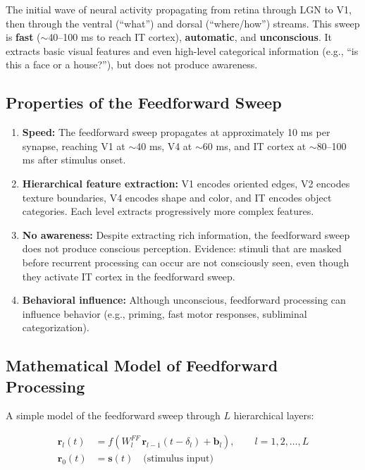 \documentclass[11pt,a4paper]{report}
\begin{document}
\begin{stagebox}
The initial wave of neural activity propagating from retina through LGN to V1, then through the ventral (``what'') and dorsal (``where/how'') streams. This sweep is \textbf{fast} ($\sim$40--100 ms to reach IT cortex), \textbf{automatic}, and \textbf{unconscious}. It extracts basic visual features and even high-level categorical information (e.g., ``is this a face or a house?''), but does not produce awareness.
\end{stagebox}

\subsection{Properties of the Feedforward Sweep}

\begin{enumerate}[leftmargin=2em]
  \item \textbf{Speed:} The feedforward sweep propagates at approximately 10 ms per synapse, reaching V1 at $\sim$40 ms, V4 at $\sim$60 ms, and IT cortex at $\sim$80--100 ms after stimulus onset.
  \item \textbf{Hierarchical feature extraction:} V1 encodes oriented edges, V2 encodes texture boundaries, V4 encodes shape and color, and IT encodes object categories. Each level extracts progressively more complex features.
  \item \textbf{No awareness:} Despite extracting rich information, the feedforward sweep does not produce conscious perception. Evidence: stimuli that are masked before recurrent processing can occur are not consciously seen, even though they activate IT cortex in the feedforward sweep.
  \item \textbf{Behavioral influence:} Although unconscious, feedforward processing can influence behavior (e.g., priming, fast motor responses, subliminal categorization).
\end{enumerate}

\subsection{Mathematical Model of Feedforward Processing}

A simple model of the feedforward sweep through $L$ hierarchical layers:

\begin{mathbox}
\vspace{-6pt}
\begin{align}
  \mathbf{r}_l(t) &= f\!\left(W_l^{FF}\, \mathbf{r}_{l-1}(t - \delta_l) + \mathbf{b}_l\right), \qquad l = 1, 2, \ldots, L \label{eq:ff_model}\\[6pt]
  \mathbf{r}_0(t) &= \mathbf{s}(t) \quad \text{(stimulus input)}
\end{align}
\vspace{-8pt}
\end{mathbox}
\end{document}
